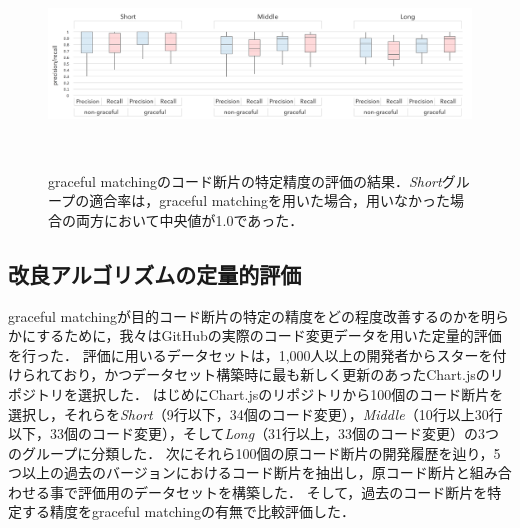 \begin{figure}[t]
  \centering
  \includegraphics[width=2.0\columnwidth]{evaluate/difftrack_eval_commit.png}
  \caption{graceful matchingのコード断片の特定精度の評価の結果．\textit{Short}グループの適合率は，graceful matchingを用いた場合，用いなかった場合の両方において中央値が1.0であった．}~\label{fig:Commit_Matching_Accuracy_Evaluation}
  \vspace{-5mm}
\end{figure}

\subsection{改良アルゴリズムの定量的評価}

graceful matchingが目的コード断片の特定の精度をどの程度改善するのかを明らかにするために，我々はGitHubの実際のコード変更データを用いた定量的評価を行った．
評価に用いるデータセットは，1,000人以上の開発者からスターを付けられており，かつデータセット構築時に最も新しく更新のあったChart.jsのリポジトリを選択した．
はじめにChart.jsのリポジトリから100個のコード断片を選択し，それらを\textit{Short}（9行以下，34個のコード変更），\textit{Middle}（10行以上30行以下，33個のコード変更），そして\textit{Long}（31行以上，33個のコード変更）の3つのグループに分類した．
次にそれら100個の原コード断片の開発履歴を辿り，5つ以上の過去のバージョンにおけるコード断片を抽出し，原コード断片と組み合わせる事で評価用のデータセットを構築した．
そして，過去のコード断片を特定する精度をgraceful matchingの有無で比較評価した．



